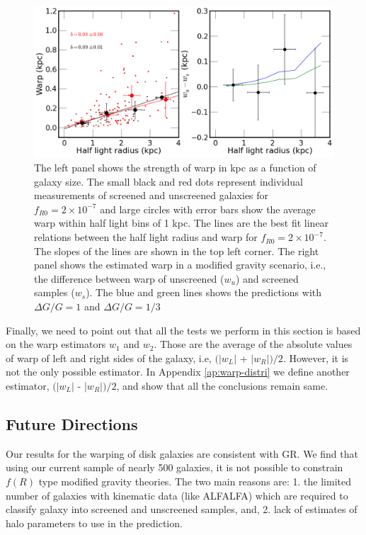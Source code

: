 \documentclass[useAMS,usenatbib,twocolumn]{mn2e}
\begin{document}
\begin{figure}
\begin{center}
\includegraphics[scale=0.43]{figures/size-warpness-kpc.png}
\caption{The left panel shows the strength of warp in kpc as a function of
galaxy size. The small black and red dots
represent individual measurements of screened and unscreened galaxies for
$f_{R0} = 2 \times10^{-7}$  and large circles
with error bars show the average warp within half light bins of 1 kpc.  The
lines are the best fit linear relations between
the half light radius and warp for $f_{R0} = 2 \times10^{-7}$. The slopes of
the lines are shown in the top left corner. The right panel shows the estimated
warp in a modified gravity scenario, i.e., the difference between warp
of unscreened
($w_u$) and screened samples ($w_s$). The blue and green lines shows the
predictions with $\Delta G/G = 1$ and $\Delta G/G = 1/3$}
\label{fig:size-warp-kpc}
\end{center}
\end{figure}



Finally, we need to point out that all the tests we perform in this section is
based on the warp estimators $w_1$ and $w_2$. Those are the average of the
absolute values of warp of left and right sides of the galaxy,
i.e, $(\left|w_L\right|$ + $\left|w_R\right|)/2$. However, it is not the only
possible estimator. In Appendix \ref{ap:warp-distri} we define another
estimator, $(\left|w_L\right|$ - $\left|w_R\right|)/2$, and show that all the
conclusions remain same.



 

\subsection{Future Directions}
Our results for the warping of disk galaxies are consistent with GR. 
We find that using our current sample of nearly 500 galaxies, 
it is not possible to constrain $f(R)$ type 
modified gravity theories.  
The two main reasons are: 1. the limited number of galaxies
with kinematic data (like ALFALFA) which are required to classify galaxy
into screened and unscreened samples, and, 2. lack of estimates of halo
parameters to use in the prediction.  
\end{document}
